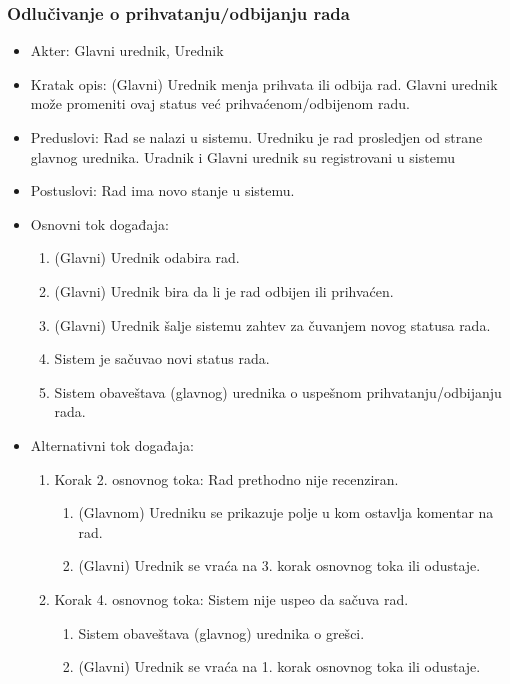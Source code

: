 \documentclass[a4paper]{article}
\begin{document}
\subsubsection{Odlučivanje o prihvatanju/odbijanju rada}
\label{subsubsection:prihvatanjeodbijanje}
\begin{itemize}
    \item Akter: Glavni urednik, Urednik
    \item Kratak opis: (Glavni) Urednik menja prihvata ili odbija rad. Glavni urednik može promeniti ovaj status već prihvaćenom/odbijenom radu.
    \item Preduslovi: Rad se nalazi u sistemu. Uredniku je rad prosledjen od strane glavnog urednika. Uradnik i Glavni urednik su registrovani u sistemu
    \item Postuslovi: Rad ima novo stanje u sistemu.
    \item Osnovni tok događaja:
        \begin{enumerate}
            \item (Glavni) Urednik odabira rad.
            \item (Glavni) Urednik bira da li je rad odbijen ili prihvaćen.
            \item (Glavni) Urednik šalje sistemu zahtev za čuvanjem novog statusa rada.
            \item Sistem je sačuvao novi status rada.
            \item Sistem obaveštava (glavnog) urednika o uspešnom prihvatanju/odbijanju rada.
        \end{enumerate}
    \item Alternativni tok događaja:
        \begin{enumerate}
            \item Korak 2. osnovnog toka: Rad prethodno nije recenziran.
                \begin{enumerate}
                    \item (Glavnom) Uredniku se prikazuje polje u kom ostavlja komentar na rad.
                    \item (Glavni) Urednik se vraća na 3. korak osnovnog toka ili odustaje.
                \end{enumerate}
            \item Korak 4. osnovnog toka: Sistem nije uspeo da sačuva rad.
            \begin{enumerate}
                \item Sistem obaveštava (glavnog) urednika o grešci.
                \item (Glavni) Urednik se vraća na 1. korak osnovnog toka ili odustaje.
            \end{enumerate}
        \end{enumerate}
\end{itemize}
\end{document}
